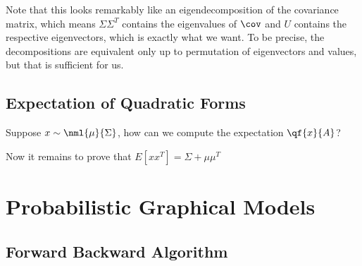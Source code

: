 \documentclass[12pt]{article}
\begin{document}

Note that this looks remarkably like an eigendecomposition of the covariance matrix, which means $\Sigma \Sigma^T$ contains the eigenvalues of $\cov$ and $U$ contains the respective eigenvectors, which is exactly what we want. To be precise, the decompositions are equivalent only up to permutation of eigenvectors and values, but that is sufficient for us.

\subsection{Expectation of Quadratic Forms}

Suppose $x \sim \nml{\mu}{\Sigma}$, how can we compute the expectation $\qf{x}{A}$?


Now it remains to prove that $E[xx^T] = \Sigma + \mu\mu^T$


\section{Probabilistic Graphical Models}
\subsection{Forward Backward Algorithm}
\end{document}
